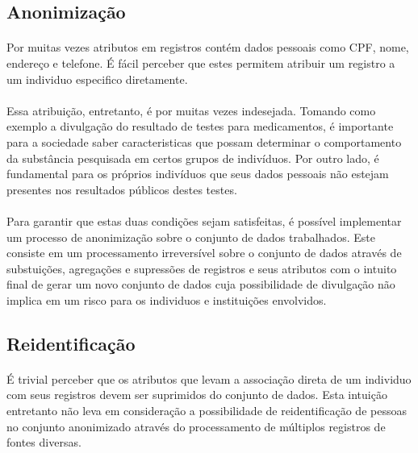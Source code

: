 \subsection{Anonimização}

\paragraph{} Por muitas vezes atributos em registros contém dados pessoais como CPF, nome, endereço e telefone. É fácil perceber que estes permitem atribuir um registro a um individuo especifico diretamente.

\paragraph{} Essa atribuição, entretanto, é por muitas vezes indesejada. Tomando como exemplo a divulgação do resultado de testes para medicamentos, é importante para a sociedade saber caracteristicas que possam determinar o comportamento da 
substância pesquisada em certos grupos de indivíduos. Por outro lado, é fundamental para os próprios indivíduos que seus dados pessoais não estejam presentes nos resultados públicos destes testes. 

\paragraph{} Para garantir que estas duas condições sejam satisfeitas, é possível implementar um processo de anonimização sobre o conjunto de dados trabalhados. Este consiste em um processamento irreversível\cite{dias2016multilingual} sobre o conjunto de dados através de substuições, agregações e supressões de registros e seus atributos com o intuito final de gerar um novo conjunto de dados cuja possibilidade de divulgação não implica em um risco para os individuos e instituições envolvidos. 

\subsection{Reidentificação}

\paragraph{} É trivial perceber que os atributos que levam a associação direta de um individuo com seus registros devem ser suprimidos do conjunto de dados. Esta intuição entretanto não leva em consideração a possibilidade de reidentificação de pessoas no conjunto anonimizado através do processamento de múltiplos registros de fontes diversas. 

